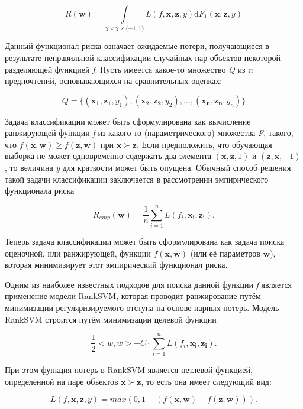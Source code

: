 \documentclass[12pt,a4paper,oneside]{article}
\begin{document}
\[
R(\mathbf{w}) = \int \limits_{\chi \times \chi \times \{-1, 1\}} L(f, \mathbf{x}, \mathbf{z}, y) \mathrm{d} F_1(\mathbf{x}, \mathbf{z}, y)
\]

\par

Данный функционал риска означает ожидаемые потери, получающиеся в результате неправильной классификации случайных пар объектов некоторой разделяющей функцией \emph{f}. 
Пусть имеется какое-то множество \emph{Q} из \emph{n} предпочтений, основывающихся на сравнительных оценках:

\[
Q = \{(\mathbf{x_1}, \mathbf{z_1}, y_1), (\mathbf{x_2}, \mathbf{z_2}, y_2), \dots, (\mathbf{x_n}, \mathbf{z_n}, y_n)\}
\]

\par
Задача классификации может быть сформулирована как вычисление ранжирующей функции \emph{f} из какого-то (параметрического) множества \emph{F}, такого, что \(f(\mathbf{x}, \mathbf{w}) \geq f(\mathbf{z}, \mathbf{w})\) при \(\mathbf{x} \succ \mathbf{z}\). 
Если предположить, что обучающая выборка не может одновременно содержать два элемента \((\mathbf{x}, \mathbf{z}, 1)\) и \((\mathbf{z}, \mathbf{x}, -1)\), то величина \emph{y} для краткости может быть опущена. 
Обычный способ решения такой задачи классификации заключается в рассмотрении эмпирического функционала риска

\[
R_{emp}(\mathbf{w}) = \frac{1}{n} \sum \limits_{i=1}^n L(f_i, \mathbf{x_i}, \mathbf{z_i}).
\]

Теперь задача классификации может быть сформулирована как задача поиска оценочной, или ранжирующей, функции \(f(\mathbf{x}, \mathbf{w})\) (или её параметров \(\mathbf{w}\)), которая минимизирует этот эмпирический функционал риска. 

\par
Одним из наиболее известных подходов для поиска данной функции \emph{f} является применение модели RankSVM, которая проводит ранжирование путём минимизации регуляризируемого отступа на основе парных потерь. 
Модель RankSVM строится путём минимизации целевой функции 

\[
\frac{1}{2} <w, w> + C \cdot \sum \limits_{i=1}^n L(f_i, \mathbf{x_i}, \mathbf{z_i}).
\] 

При этом функция потерь в RankSVM является петлевой функцией, определённой на паре объектов \(\mathbf{x} \succ \mathbf{z}\), то есть она имеет следующий вид:

\[
L(f, \mathbf{x}, \mathbf{z}, y) = max(0, 1 - (f(\mathbf{x}, \mathbf{w}) - f(\mathbf{z}, \mathbf{w}))).
\]
\end{document}

